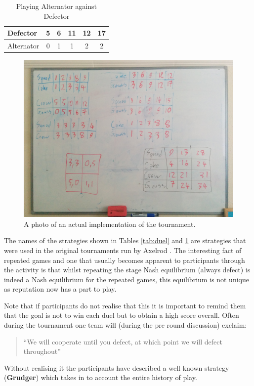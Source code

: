 \documentclass[12pt, a4paper]{article}
\begin{document}
\begin{table}[!htbp]
    \caption{Playing Alternator against Defector}
    \centering
    \begin{tabular}{lccccc}
        \toprule
        Defector&5&6&11&12&17\\
        \midrule
        Alternator&0&1&1&2&2\\
        \bottomrule
    \end{tabular}
    \label{tab:duel_1}
\end{table}

\begin{figure}[!hbtp]
    \centering
    \includegraphics[width=.5\textwidth]{static/white_board.jpg}
    \caption{A photo of an actual implementation of the tournament.}
    \label{fig:white_board}
\end{figure}

The names of the strategies shown in Tables \ref{tab:duel} and \ref{tab:duel_1}
are strategies that were used in the original tournaments run by Axelrod
\cite{Axelrod1980a, Axelrod1980b}. The interesting fact of repeated games and
one that usually becomes apparent to participants through the activity is that
whilst repeating the stage Nash equilibrium (always defect) is indeed a Nash
equilibrium for the repeated games, this equilibrium is not unique as reputation
now has a part to play.

Note that if participants do not realise that this it is important to remind
them that the goal is not to win each duel but to obtain a high score overall.
Often during the tournament one team will (during the pre round discussion)
exclaim:

\begin{quote}
   ``We will cooperate until you defect, at which point we will defect
throughout''
\end{quote}

Without realising it the participants have described a well known strategy
(\textbf{Grudger}) which takes in to account the entire history of play.
\end{document}

